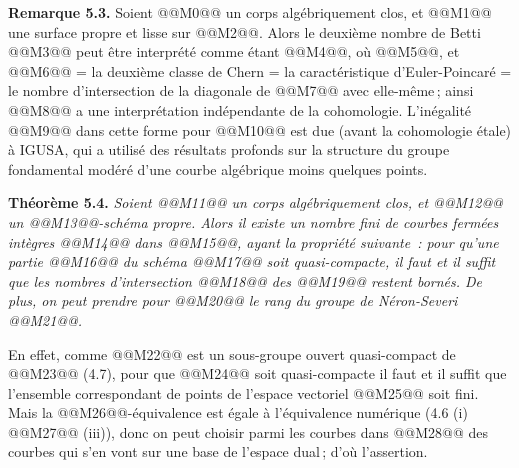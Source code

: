 
\textbf{Remarque 5.3.} Soient @@M0@@ un corps alg\'ebriquement clos, et @@M1@@ une surface propre et lisse sur @@M2@@. Alors le deuxi\`eme nombre de Betti @@M3@@ peut \^etre interpr\'et\'e comme \'etant @@M4@@, o\`u @@M5@@, et @@M6@@ = la deuxi\`eme classe de Chern = la caract\'eristique d'Euler-Poincar\'e = le nombre d'intersection de la diagonale de @@M7@@ avec elle-m\^eme\,; ainsi @@M8@@ a une interpr\'etation ind\'ependante de la cohomologie. L'in\'egalit\'e @@M9@@ dans cette forme pour @@M10@@ est due (avant la cohomologie \'etale) \`a IGUSA, qui a utilis\'e des r\'esultats profonds sur la structure du groupe fondamental mod\'er\'e d'une courbe alg\'ebrique moins quelques points.

\textbf{Th\'eor\`eme 5.4.} \emph{Soient @@M11@@ un corps alg\'ebriquement clos, et @@M12@@ un @@M13@@-sch\'ema propre. Alors il existe un nombre fini de courbes ferm\'ees int\`egres @@M14@@ dans @@M15@@, ayant la propri\'et\'e suivante~: pour qu'une partie @@M16@@ du sch\'ema @@M17@@ soit quasi-compacte, il faut et il suffit que les nombres d'intersection @@M18@@ des @@M19@@ restent born\'es. De plus, on peut prendre pour @@M20@@ le rang du groupe de N\'eron-Severi @@M21@@.}

En effet, comme @@M22@@ est un sous-groupe ouvert quasi-compact de @@M23@@ (4.7), pour que @@M24@@ soit quasi-compacte il faut et il suffit que l'ensemble correspondant de points de l'espace vectoriel @@M25@@ soit fini. Mais la @@M26@@-\'equivalence est \'egale \`a l'\'equivalence num\'erique (4.6 (i) @@M27@@ (iii)), donc on peut choisir parmi les courbes dans @@M28@@ des courbes qui s'en vont sur une base de l'espace dual\,; d'o\`u l'assertion.

